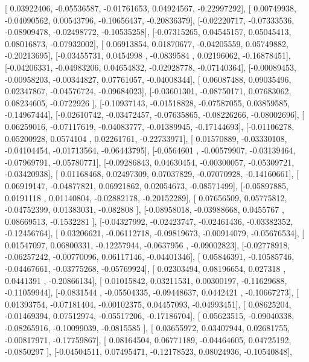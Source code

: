 \documentclass{article}
\begin{document}
       [ 0.03922406, -0.05536587, -0.01761653,  0.04924567, -0.22997292],
       [ 0.00749938, -0.04090562,  0.00543796, -0.10656437, -0.20836379],
       [-0.02220717, -0.07333536, -0.08909478, -0.02498772, -0.10535258],
       [-0.07315265,  0.04545157,  0.05045413,  0.08016873, -0.07932002],
       [ 0.06913854,  0.01870677, -0.04205559,  0.05749882, -0.20213695],
       [-0.03455731,  0.0454998 , -0.0839584 ,  0.02196062, -0.16878451],
       [-0.04206331, -0.04983206,  0.04654832, -0.02928778, -0.07140364],
       [-0.00089453, -0.00958203, -0.00344827,  0.07761057, -0.04008344],
       [ 0.06087488,  0.09035496,  0.02347867, -0.04576724, -0.09684023],
       [-0.03601301, -0.08750171,  0.07683062,  0.08234605, -0.0722926 ],
       [-0.10937143, -0.01518828, -0.07587055,  0.03859585, -0.14967444],
       [-0.02610742, -0.03472457, -0.07635865, -0.08226266, -0.08002696],
       [ 0.06259016, -0.07117619, -0.04083777, -0.01389945, -0.17144693],
       [-0.01106278,  0.05200928,  0.0574104 ,  0.02261761, -0.22733971],
       [ 0.01570889, -0.03330108, -0.04104454, -0.01713564, -0.06443795],
       [-0.0564601 , -0.00579907, -0.03139464, -0.07969791, -0.05780771],
       [-0.09286843,  0.04630454, -0.00300057, -0.05309721, -0.03420938],
       [ 0.01168468,  0.02497309,  0.07037829, -0.07070928, -0.14160661],
       [ 0.06919147, -0.04877821,  0.06921862,  0.02054673, -0.08571499],
       [-0.05897885,  0.0191118 ,  0.01140804, -0.02882178, -0.20152289],
       [ 0.07656509,  0.05775812, -0.04752399,  0.01383031, -0.082808  ],
       [-0.08958018, -0.03988668,  0.0455767 ,  0.08669513, -0.1532281 ],
       [-0.04327992, -0.02423747, -0.02461436, -0.03382352, -0.12456764],
       [ 0.03206621, -0.06112718, -0.09819673, -0.00914079, -0.05676534],
       [ 0.01547097,  0.06800331, -0.12257944, -0.0637956 , -0.09002823],
       [-0.02778918, -0.06257242, -0.00770096,  0.06117146, -0.04401346],
       [ 0.05846391, -0.10585746, -0.04467661, -0.03775268, -0.05769924],
       [ 0.02303494,  0.08196654,  0.027318  ,  0.0441391 , -0.20866134],
       [ 0.01015842,  0.03211531,  0.00300197, -0.11629688, -0.11059944],
       [-0.0831544 , -0.05504335, -0.09448637,  0.0442421 , -0.10667273],
       [ 0.01393754, -0.07181404, -0.00102375,  0.04457093, -0.04993451],
       [ 0.08625204, -0.01469394,  0.07512974, -0.05517206, -0.17186704],
       [ 0.05623515, -0.09040338, -0.08265916, -0.10099039, -0.0815585 ],
       [ 0.03655972,  0.03407944,  0.02681755, -0.00817971, -0.17759867],
       [ 0.08164504,  0.06771189, -0.04464605,  0.04725192, -0.0850297 ],
       [-0.04504511,  0.07495471, -0.12178523,  0.08024936, -0.10540848],
\end{document}
